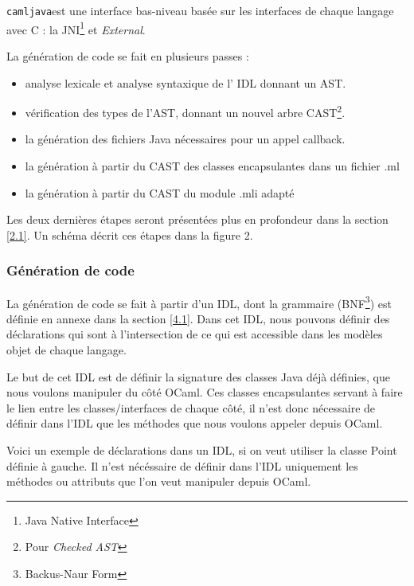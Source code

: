 \documentclass[a4paper, 11pt]{article}
\newcommand{\camljava}{{\tt{camljava}}}
\begin{document}
\camljava est une interface bas-niveau basée sur les interfaces de chaque langage avec C : la JNI\footnote{Java Native Interface} et \emph{External}.

La génération de code se fait en plusieurs passes :
\begin{itemize}
\item analyse lexicale et analyse syntaxique de l' IDL donnant un AST.
\item vérification des types de l'AST, donnant un nouvel arbre CAST\footnote{Pour \emph{Checked AST}}.
\item la génération des fichiers Java nécessaires pour un appel callback. 
\item la génération à partir du CAST des classes encapsulantes dans un fichier .ml
\item la génération à partir du CAST du module .mli adapté
\end{itemize}
Les deux dernières étapes seront présentées plus en profondeur dans la
section \ref{2.1}.
Un schéma décrit ces étapes dans la figure 2. 




\subsubsection{Génération de code}
La génération de code se fait à partir d'un IDL, dont la grammaire
(BNF\footnote{Backus-Naur Form}) est définie en annexe dans la section \ref{4.1}.
Dans cet IDL, nous pouvons définir des déclarations qui sont à
l'intersection de ce qui est accessible dans les modèles objet de
chaque langage. 

Le but de cet IDL est de définir la signature des
classes Java déjà définies, que nous voulons manipuler du côté OCaml.
Ces classes encapsulantes servant à faire le lien entre les
classes/interfaces de chaque côté, il n'est donc nécessaire de définir
dans l'IDL que les méthodes que nous voulons appeler depuis OCaml.

Voici un exemple de déclarations dans un IDL, si on veut utiliser la classe Point définie à gauche. Il n'est nécéssaire de définir dans l'IDL uniquement les méthodes ou attributs que l'on veut manipuler depuis OCaml.
\end{document}
